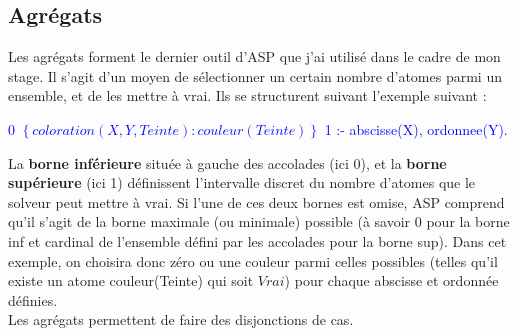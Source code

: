 \documentclass[10pt,a4paper]{article}
\begin{document}
\subsection{Agrégats}
Les agrégats forment le dernier outil d'ASP que j'ai utilisé dans le cadre de mon stage. Il s'agit d'un moyen de sélectionner un certain nombre d'atomes parmi un ensemble, et de les mettre à vrai. Ils se 
structurent suivant l'exemple suivant :
\begin{center}
\textcolor{blue}{
  0 $\left\{ coloration(X, Y, Teinte):couleur(Teinte)\right\}$ 1 :- abscisse(X), ordonnee(Y).
}
\end{center}
La \textbf{borne inférieure} située à gauche des accolades (ici 0), et la \textbf{borne supérieure} (ici 1) définissent l'intervalle discret du nombre d'atomes que le solveur peut mettre à vrai. Si l'une de ces deux bornes est 
omise, ASP comprend qu'il s'agit de la borne maximale (ou minimale) possible (à savoir 0 pour la borne inf et cardinal de l'ensemble défini par les accolades pour la borne sup). Dans cet exemple, on choisira donc zéro ou une
couleur parmi celles possibles (telles qu'il existe un atome couleur(Teinte) qui soit $Vrai$) pour chaque abscisse et ordonnée définies.\\
Les agrégats permettent de faire des disjonctions de cas.
\end{document}
